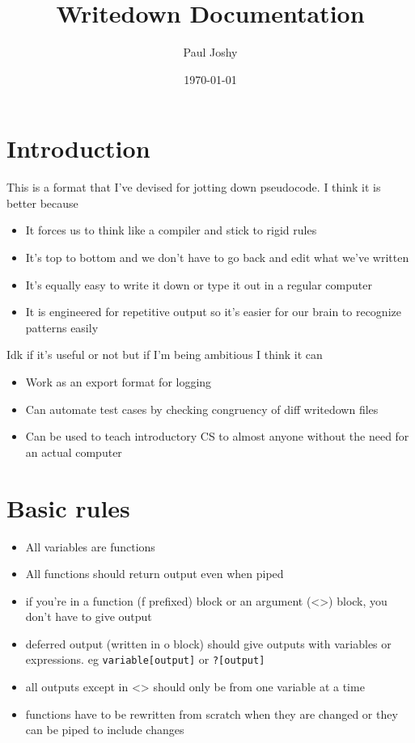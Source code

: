 \documentclass[11pt]{article}
\author{Paul Joshy}
\date{\today}
\title{Writedown Documentation}
\begin{document}
\maketitle
\tableofcontents


\section{Introduction}
\label{sec:org6e6ef8a}

This is a format that I've devised for jotting down pseudocode. I think it is better because
\begin{itemize}
\item It forces us to think like a compiler and stick to rigid rules
\item It's top to bottom and we don't have to go back and edit what we've written
\item It's equally easy to write it down or type it out in a regular computer
\item It is engineered for repetitive output so it's easier for our brain to recognize patterns easily
\end{itemize}


Idk if it's useful or not but if I'm being ambitious I think it can

\begin{itemize}
\item Work as an export format for logging
\item Can automate test cases by checking congruency of diff writedown files
\item Can be used to teach introductory CS to almost anyone without the need for an actual computer
\end{itemize}

\section{Basic rules}
\label{sec:org3a0cf10}

\begin{itemize}
\item All variables are functions
\item All functions should return output even when piped
\item if you're in a function (f prefixed) block or an argument (<>) block, you don't have to give output
\item deferred output (written in o block) should give outputs with variables or expressions. eg \texttt{variable[output]} or \texttt{?[output]}
\item all outputs except in <> should only be from one variable at a time
\item functions have to be rewritten from scratch when they are changed or they can be piped to include changes
\end{itemize}
\end{document}
